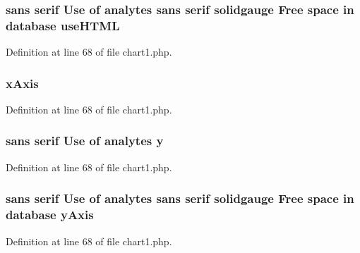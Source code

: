 \hypertarget{chart1_8php_af4a7422c75cb1e9ea64434c72d9ad6cb}{
\subsubsection[{use\-H\-T\-M\-L}]{ sans serif Use of analytes sans serif solidgauge Free space in database use\-H\-T\-M\-L}}\label{chart1_8php_af4a7422c75cb1e9ea64434c72d9ad6cb}


Definition at line 68 of file chart1.\-php.

\hypertarget{chart1_8php_a85ea519cf3eb0270da0091d07e8ee727}{
\subsubsection[{x\-Axis}]{ x\-Axis}}\label{chart1_8php_a85ea519cf3eb0270da0091d07e8ee727}


Definition at line 68 of file chart1.\-php.

\hypertarget{chart1_8php_a4e10c31b21f9f97e6e64112e5987bd13}{
\subsubsection[{y}]{ sans serif Use of analytes y}}\label{chart1_8php_a4e10c31b21f9f97e6e64112e5987bd13}


Definition at line 68 of file chart1.\-php.

\hypertarget{chart1_8php_a904b354726e35f255d93b70b37987c76}{
\subsubsection[{y\-Axis}]{ sans serif Use of analytes sans serif solidgauge Free space in database y\-Axis}}\label{chart1_8php_a904b354726e35f255d93b70b37987c76}


Definition at line 68 of file chart1.\-php.

